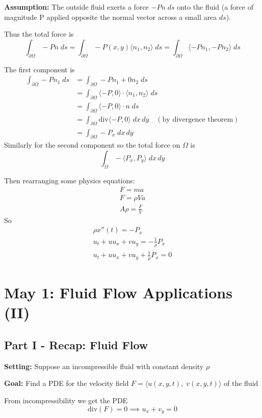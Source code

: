 \documentclass[12pt]{article}
\newcommand{\brak}[1]{\langle #1 \rangle}
\renewcommand{\div}{\text{div}}
\begin{document}
\textbf{Assumption:} The outside fluid exerts a force $-Pn\; ds$ onto the fluid (a force of magnitude P applied opposite the normal vector across a small area $ds$).

Thus the total force is 
\[\int_{\partial \Omega} -Pn\;ds = \int_{\partial \Omega} -P(x, y)\brak{n_1, n_2}\; ds = \int_{\partial \Omega} \brak{-Pn_1, -Pn_2}\; ds\]

The first component is 
\begin{align*}
    \int_{\partial \Omega} -Pn_1 \; ds &= \int_{\partial \Omega} -Pn_1 + 0n_2 \; ds\\
    &= \int_{\partial \Omega} \brak{-P, 0} \cdot \brak{n_1, n_2}\; ds\\
    &= \int_{\partial \Omega} \brak{-P, 0} \cdot n\; ds\\
    &= \int_{\partial \Omega} \div \brak{-P, 0}\; dx\, dy \quad (\text{by divergence theorem})\\
    &= \int_{\partial \Omega} -P_x\; dx \, dy
\end{align*}
Similarly for the second component so the total force on $\Omega$ is 
\[\int_{\Omega} -\brak{P_x, P_y}\; dx\, dy\]

Then rearranging some physics equations:
\begin{gather*}
    F = ma\\
    F = \rho Va\\
    A\rho = \frac{F}{V}
\end{gather*}
So 
\begin{gather*}
    \rho x''(t) = -P_x\\
    u_t + uu_x + vu_y = -\frac{1}{\rho} P_x\\
    \boxed{u_t + uu_x + vu_y + \frac{1}{\rho} P_x = 0}
\end{gather*}

\section{May 1: Fluid Flow Applications (II)}
\subsection*{Part I - Recap: Fluid Flow}
\textbf{Setting:} Suppose an incompressible fluid with constant density $\rho$ 

\textbf{Goal:} Find a PDE for the velocity field $F = \brak{u(x, y, t),\; v(x, y, t)}$ of the fluid 

From incompressibility we get the PDE
\[\div(F) = 0 \implies \boxed{u_x + v_y = 0}\]
\end{document}
